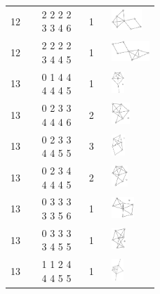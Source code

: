\begin{footnotesize}
\begin{longtable}{m{0.07\linewidth} m{0.15\linewidth} m{0.05\linewidth} m{0.15\linewidth}}
12 & 2 2 2 2 3 3 4 6 & 1 & \includegraphics[height=0.8cm]{15-universal-graphs/img/degree-sequences-example-graphs/graph-4-8-25}\\
12 & 2 2 2 2 3 4 4 5 & 1 & \includegraphics[height=0.8cm]{15-universal-graphs/img/degree-sequences-example-graphs/graph-4-8-26}\\
13 & 0 1 4 4 4 4 4 5 & 1 & \includegraphics[height=0.8cm]{15-universal-graphs/img/degree-sequences-example-graphs/graph-4-8-27}\\
13 & 0 2 3 3 4 4 4 6 & 2 & \includegraphics[height=0.8cm]{15-universal-graphs/img/degree-sequences-example-graphs/graph-4-8-28}\\
13 & 0 2 3 3 4 4 5 5 & 3 & \includegraphics[height=0.8cm]{15-universal-graphs/img/degree-sequences-example-graphs/graph-4-8-29}\\
13 & 0 2 3 4 4 4 4 5 & 2 & \includegraphics[height=0.8cm]{15-universal-graphs/img/degree-sequences-example-graphs/graph-4-8-30}\\
13 & 0 3 3 3 3 3 5 6 & 1 & \includegraphics[height=0.8cm]{15-universal-graphs/img/degree-sequences-example-graphs/graph-4-8-31}\\
13 & 0 3 3 3 3 4 5 5 & 1 & \includegraphics[height=0.8cm]{15-universal-graphs/img/degree-sequences-example-graphs/graph-4-8-32}\\
13 & 1 1 2 4 4 4 5 5 & 1 & \includegraphics[height=0.8cm]{15-universal-graphs/img/degree-sequences-example-graphs/graph-4-8-33}\\

\end{longtable}
\end{footnotesize}
